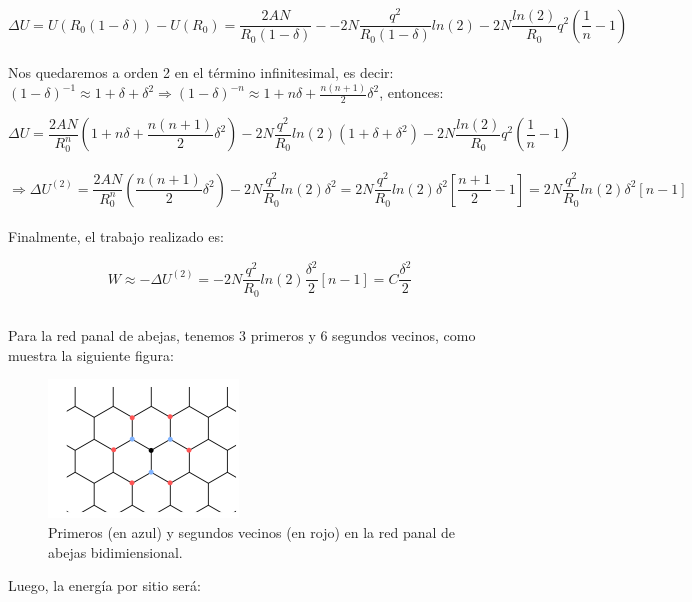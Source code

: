 \documentclass[a4paper]{article}
\begin{document}
$$ \Delta U = U(R_{0}(1 - \delta)) - U(R_{0}) = \frac{2AN}{R_{0}(1 - \delta)} - -2N\frac{q^{2}}{R_{0}(1 - \delta)}ln(2) - 2N\frac{ln(2)}{R_{0}}q^{2}\left(\frac{1}{n} - 1 \right)$$\\

Nos quedaremos a orden 2 en el t\'ermino infinitesimal, es decir: $ (1 - \delta)^{-1} \approx 1 + \delta + \delta^{2} \Rightarrow (1 - \delta)^{-n} \approx 1 + n\delta + \frac{n(n+1)}{2}\delta^{2}$, entonces:

$$ \Delta U = \frac{2AN}{R_{0}^{n}}\left(1 + n\delta + \frac{n(n+1)}{2}\delta^{2}\right) -2N\frac{q^{2}}{R_{0}}ln(2)\left(1 + \delta + \delta^{2}\right) - 2N\frac{ln(2)}{R_{0}}q^{2}\left(\frac{1}{n} - 1 \right)$$\\

$$ \Rightarrow \Delta U^{(2)} = \frac{2AN}{R_{0}^{n}}\left(\frac{n(n+1)}{2}\delta^{2}\right) -2N\frac{q^{2}}{R_{0}}ln(2)\delta^{2} = 2N\frac{q^{2}}{R_{0}}ln(2)\delta^{2}\left[ \frac{n+1}{2} - 1\right] = 2N\frac{q^{2}}{R_{0}}ln(2)\delta^{2}\left[ n - 1\right]$$\\

Finalmente, el trabajo realizado es:

$$ W \approx - \Delta U^{(2)} = -2N\frac{q^{2}}{R_{0}}ln(2)\frac{\delta^{2}}{2}\left[ n - 1\right] = C\frac{\delta^{2}}{2}$$

\subsection{}
\subsection{}

Para la red panal de abejas, tenemos 3 primeros y 6 segundos vecinos, como muestra la siguiente figura:

\begin{figure}[H]
  \centering
  \includegraphics[width=0.3\linewidth,height=0.2\linewidth]{abejas.png}
  \caption{Primeros (en azul) y segundos vecinos (en rojo) en la red panal de abejas bidimiensional.}
  \label{fig:abejas}
\end{figure}

Luego, la energ\'ia por sitio ser\'a:
\end{document}
